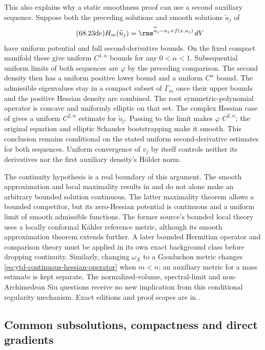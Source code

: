 This also explains why a static smoothness proof can use a second
auxiliary sequence. Suppose both the preceding solutions and smooth
solutions $\widetilde u_j$ of
\[
\tag{68.23de}\label{eq:ytd-continuous-hessian-second-auxiliary}
 H_m(\widetilde u_j)
       =\rme^{\widetilde u_j-u_j+f(x,u_j)}\,dV
\]
have uniform potential and full second-derivative bounds. On the
fixed compact manifold these give uniform $C^{1,\alpha}$ bounds
for any $0<\alpha<1$. Subsequential uniform limits of both
sequences are $\varphi$ by the preceding comparison. The second
density then has a uniform positive lower bound and a uniform
$C^\alpha$ bound. The admissible eigenvalues stay in a compact
subset of $\Gamma_m$ once their upper bounds and the positive
Hessian density are combined. The root symmetric-polynomial
operator is concave and uniformly elliptic on that set. The
complex Hessian case of
\cite[Theorem~1.1 and Section~2.1]{TWWY14EstimatesV2} gives a
uniform $C^{2,\alpha}$ estimate for $\widetilde u_j$.
Passing to the limit makes $\varphi$ $C^{2,\alpha}$; the original
equation and elliptic Schauder bootstrapping make it smooth.
This conclusion remains conditional on the stated uniform
second-derivative estimates for both sequences. Uniform convergence
of $v_j$ by itself controls neither its derivatives nor the first
auxiliary density's H\"older norm.

The continuity hypothesis is a real boundary of this argument.
The smooth approximation and local maximality results in
\cite[Theorem~3.18 and Remark~3.19]{GuNguyen18DirichletPublished}
and \cite[Theorem~2.16]{KN16WeakHessianV2} do not alone make an
arbitrary bounded solution continuous. The latter maximality theorem
allows a bounded competitor, but its zero-Hessian potential is
continuous and a uniform limit of smooth admissible functions.
The former source's bounded local theory uses a locally conformal
K\"ahler reference metric, although its smooth approximation theorem
extends further. A later bounded Hermitian operator and comparison
theory must be applied in its own exact background class before
dropping continuity. Similarly, changing $\omega_X$ to a Gauduchon
metric changes \eqref{eq:ytd-continuous-hessian-operator} when
$m<n$; an auxiliary metric for a mass estimate is kept separate.
The normalized-volume, spectral-limit and non-Archimedean Siu
questions receive no new implication from this conditional
regularity mechanism. Exact editions and proof scopes are in
.

\subsection{Common subsolutions, compactness and direct gradients}
\label{sec:ytd-direct-gradient-compactness}

